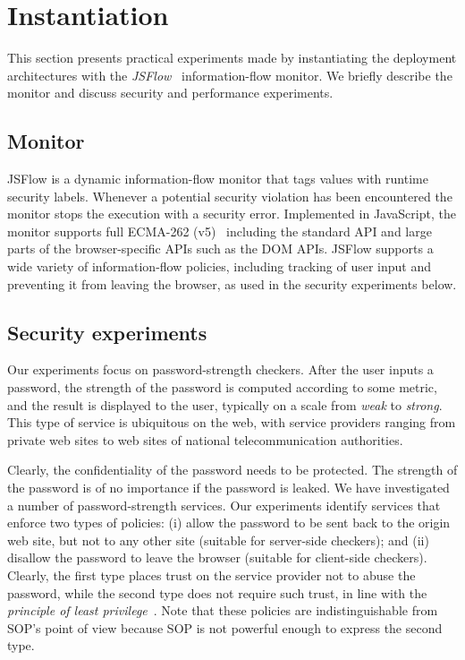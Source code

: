 \documentclass{llncs}
\begin{document}

\section{Instantiation}
\label{sec:case}

This section presents practical experiments made by instantiating the deployment
architectures with the \emph{JSFlow}~\cite{Hedin:Sabelfeld:CSF12,JSFlow} information-flow monitor. 
We briefly describe the monitor and discuss security and performance experiments.

\subsection{Monitor}

JSFlow is a dynamic information-flow monitor that tags values with runtime
security labels. Whenever a potential security
violation has been encountered the monitor stops the execution with a security
error. Implemented in JavaScript, the monitor supports
full 
ECMA-262 (v5)~\cite{ecma:262:5} including the standard API and large parts of the
browser-specific APIs such as the DOM APIs. 
JSFlow supports a wide variety of information-flow policies,
including tracking of user input and preventing it from leaving the
browser, as used in
the security experiments below.

\subsection{Security experiments}
Our experiments focus on password-strength checkers. 
After the user inputs a password, the strength of the password is computed according
to some metric, and the result is displayed to the user, typically on a scale
from \emph{weak} to \emph{strong}. This type of service is ubiquitous
on the web, with service providers ranging from private web sites to web sites
of national telecommunication authorities.

Clearly, the confidentiality of the password needs to be protected.  The
strength of the password is of no importance if the password is leaked.  We
have investigated a number of password-strength services. 
Our experiments identify services that enforce two types of policies: (i)
allow the password to be sent back to the origin web site, but not to
any other site (suitable for server-side checkers); and (ii) disallow the password
to leave the browser (suitable for client-side checkers). 
Clearly, the first type places trust on the service provider not to
abuse the password, while the second type does not require such trust,
in line with the \emph{principle of least
privilege}~\cite{Saltzer:Schroeder:TCB}.
Note that these policies are indistinguishable from SOP's point of
view because SOP is not powerful enough to express the second type.
\end{document}
